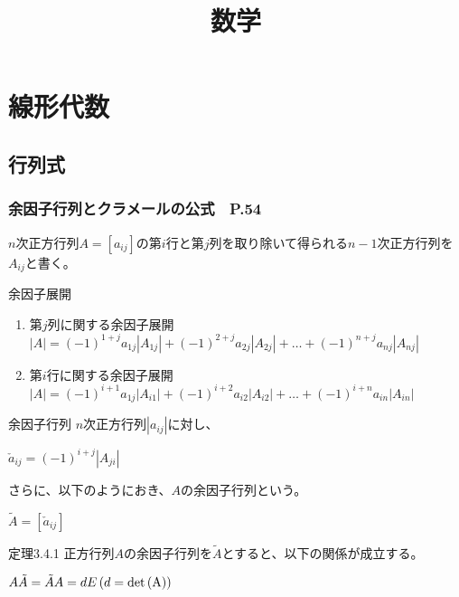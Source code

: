 \documentclass[a4paper]{jsarticle}
\author{}
\title{数学}
\date{}
\begin{document}
\maketitle

\section{線形代数}
\subsection{行列式}
\subsubsection{余因子行列とクラメールの公式　P.54}
$n$次正方行列$A=\left[a_{ij}\right]$の第$i$行と第$j$列を取り除いて得られる$n-1$次正方行列を$A_{ij}$と書く。
\begin{itembox}[l]{余因子展開}
    \begin{enumerate}
        \item 第$j$列に関する余因子展開\\
              $\left|A\right|=(-1)^{1+j}a_{1j}\left|A_{1j}\right|+(-1)^{2+j}a_{2j}\left|A_{2j}\right|+ \dots +(-1)^{n+j}a_{nj}\left|A_{nj}\right|$
        \item 第$i$行に関する余因子展開\\
              $\left|A\right|=(-1)^{i+1}a_{1j}\left|A_{i1}\right|+(-1)^{i+2}a_{i2}\left|A_{i2}\right|+ \dots +(-1)^{i+n}a_{in}\left|A_{in}\right|$
    \end{enumerate}
\end{itembox}
\begin{itembox}[l]{余因子行列}
    $n$次正方行列$\left|a_{ij}\right|$に対し、
    \begin{center}
        $\check{a}_{ij}=\left(-1\right)^{i+j}\left|A_{ji}\right|$
    \end{center}
    さらに、以下のようにおき、$A$の余因子行列という。
    \begin{center}
        $\tilde{A}=\left[\check{a}_{ij}\right]$
    \end{center}
\end{itembox}
\begin{itembox}[l]{定理3.4.1}
    正方行列$A$の余因子行列を$\tilde{A}$とすると、以下の関係が成立する。
    \begin{center}
        $A\tilde{A}=\tilde{A}A=dE\left (d=\rm{det}\left(A\right)\right)$
    \end{center}
\end{itembox}
\end{document}
